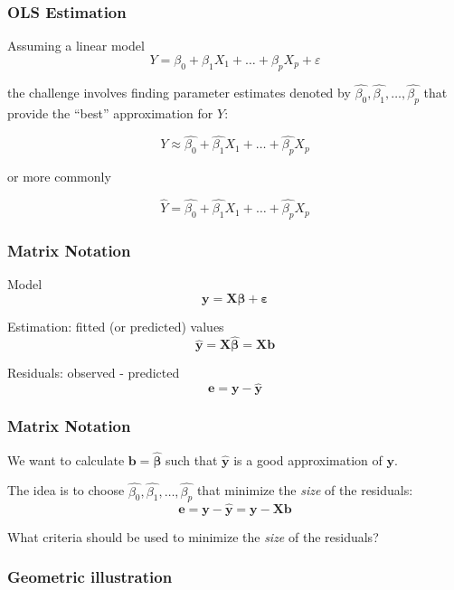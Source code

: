 \documentclass[12pt]{beamer}\usepackage[]{graphicx}\usepackage[]{color}
\begin{document}
\begin{frame}
\frametitle{OLS Estimation}

Assuming a linear model
$$
Y = \beta_0 + \beta_1 X_1 + \dots + \beta_p X_p + \varepsilon
$$

the challenge involves finding parameter estimates denoted by 
$\hat{\beta_0}, \hat{\beta_1}, \dots, \hat{\beta_p}$ that provide the ``best''
approximation for $Y$:

$$
Y \approx \hat{\beta_0} + \hat{\beta_1} X_1 + \dots + \hat{\beta_p} X_p
$$

or more commonly

$$
\hat{Y} = \hat{\beta_0} + \hat{\beta_1} X_1 + \dots + \hat{\beta_p} X_p
$$

\end{frame}


\begin{frame}
\frametitle{Matrix Notation}

{\mdlit Model}
$$
\mathbf{y = X \boldsymbol{\beta} + \boldsymbol{\varepsilon}}
$$

\bigskip
{\mdlit Estimation}: fitted (or predicted) values
$$
\mathbf{\hat{y} = X \boldsymbol{\hat{\beta}} = Xb}
$$

\bigskip
{\mdlit Residuals}: observed - predicted
$$
\mathbf{e = y - \hat{y}}
$$

\end{frame}


\begin{frame}
\frametitle{Matrix Notation}

We want to calculate $\mathbf{b} = \boldsymbol{\hat{\beta}}$ such that $\mathbf{\hat{y}}$ is a 
good approximation of $\mathbf{y}$. 

\bigskip
The idea is to choose $\hat{\beta_0}, \hat{\beta_1}, \dots, \hat{\beta_p}$ that 
minimize the \textit{size} of the residuals:
$$
\mathbf{e = y - \hat{y} = y - Xb}
$$

What criteria should be used to minimize the \textit{size} of the residuals?

\end{frame}


\begin{frame}
\frametitle{Geometric illustration}
\begin{center}
\end{center}
\end{frame}
\end{document}
